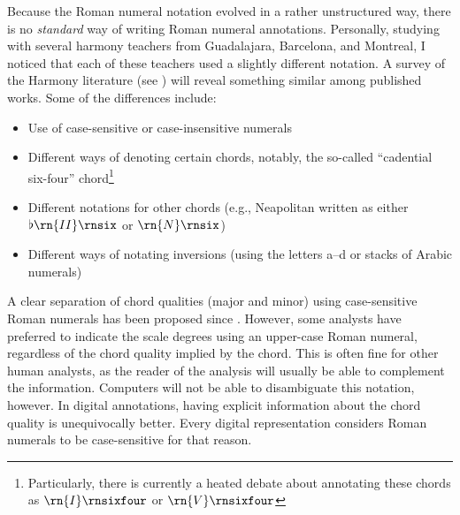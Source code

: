 

Because the Roman numeral notation evolved in a rather
unstructured way, there is no \emph{standard} way of writing
Roman numeral annotations. Personally, studying with several
harmony teachers from Guadalajara, Barcelona, and Montreal,
I noticed that each of these teachers used a slightly
different notation. A survey of the Harmony literature (see
) will reveal something similar among
published works. Some of the differences include:

\begin{itemize}
    \item Use of case-sensitive or case-insensitive numerals
    \item Different ways of denoting certain chords,
    notably, the so-called ``cadential six-four''
    chord\footnote{Particularly, there is currently a heated
    debate about annotating these chords as
    $\rn{I}\rnsixfour$ or $\rn{V}\rnsixfour$}
    \item Different notations for other chords (e.g.,
    Neapolitan written as either $\flat\rn{II}\rnsix$ or
    $\rn{N}\rnsix$)
    \item Different ways of notating inversions (using the
    letters a--d or stacks of Arabic numerals)
\end{itemize}

A clear separation of chord qualities (major and minor)
using case-sensitive Roman numerals has been proposed since
\textcite{weber1817versuch}. However, some analysts have
preferred to indicate the scale degrees using an upper-case
Roman numeral, regardless of the chord quality implied by
the chord. This is often fine for other human analysts, as
the reader of the analysis will usually be able to
complement the information. Computers will not be able to
disambiguate this notation, however. In digital annotations,
having explicit information about the chord quality is
unequivocally better. Every digital representation considers
Roman numerals to be case-sensitive for that reason.


